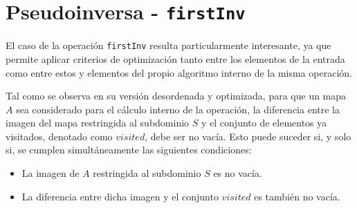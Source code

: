  
\begin{center}
\end{center}


\section{Pseudoinversa - \texttt{firstInv}}

El caso de la operación \texttt{firstInv} resulta particularmente interesante, ya que permite aplicar criterios de optimización tanto entre los elementos de la entrada como entre estos y elementos del propio algoritmo interno de la misma operación.

Tal como se observa en su versión desordenada y optimizada, para que un mapa $A$ sea considerado para el cálculo interno de la operación, la diferencia entre la imagen del mapa restringida al subdominio $S$ y el conjunto de elementos ya visitados, denotado como $visited$, debe ser no vacía. Esto puede suceder si, y solo si, se cumplen simultáneamente las siguientes condiciones:
\begin{itemize}
    \item La imagen de $A$ restringida al subdominio $S$ es no vacía.
    \item La diferencia entre dicha imagen y el conjunto $visited$ es también no vacía.
\end{itemize}

